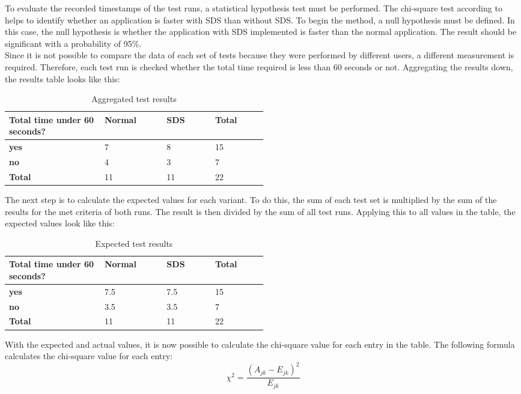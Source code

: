 To evaluate the recorded timestamps of the test runs, a statistical hypothesis test must be performed. The chi-square test according to \citeauthor{pearson_x_1900} helps to identify whether an application is faster with SDS than without SDS. To begin the method, a null hypothesis must be defined. In this case, the null hypothesis is whether the application with SDS implemented is faster than the normal application. The result should be significant with a probability of 95\%. \cite{pearson_x_1900} \\ 
Since it is not possible to compare the data of each set of tests because they were performed by different users, a different measurement is required. Therefore, each test run is checked whether the total time required is less than 60 seconds or not. Aggregating the results down, the results table looks like this:
\begin{table}[ht]
    \centering
    \begin{tabular}{|p{0.2\linewidth} || p{0.1\linewidth}|p{0.1\linewidth}|p{0.1\linewidth}|}
        \hline
        \textbf{Total time under 60 seconds?} &\textbf{Normal}&\textbf{\ac{SDS}}&\textbf{Total} \\ \hline\hline
        \textbf{yes} & 7 & 8 & 15 \\ \hline
        \textbf{no} & 4 & 3 & 7 \\ \hline
        \textbf{Total} & 11 & 11 & 22 \\ \hline
    \end{tabular}
    \caption{\label{tab:chi-square} Aggregated test results}
\end{table}
The next step is to calculate the expected values for each variant. To do this, the sum of each test set is multiplied by the sum of the results for the met criteria of both runs. The result is then divided by the sum of all test runs. Applying this to all values in the table, the expected values look like this:
\begin{table}[ht]
    \centering
    \begin{tabular}{|p{0.2\linewidth} || p{0.1\linewidth}|p{0.1\linewidth}|p{0.1\linewidth}|}
        \hline
        \textbf{Total time under 60 seconds?} &\textbf{Normal}&\textbf{\ac{SDS}}&\textbf{Total} \\ \hline\hline
        \textbf{yes} & 7.5 & 7.5 & 15 \\ \hline
        \textbf{no} & 3.5 & 3.5 & 7 \\ \hline
        \textbf{Total} & 11 & 11 & 22 \\ \hline
    \end{tabular}
    \caption{\label{tab:chi-square-expected} Expected test results}
\end{table}
With the expected and actual values, it is now possible to calculate the chi-square value for each entry in the table. The following formula calculates the chi-square value for each entry:
\[\chi^2=\frac{(A_{jk} - E_{jk})^2}{E_{jk}}\]

